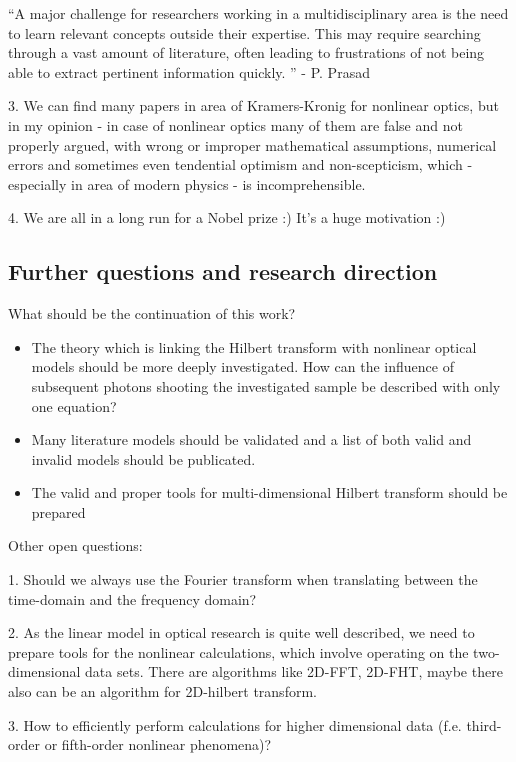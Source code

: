 \documentclass[12pt,twoside,a4paper]{article}
\numberwithin{equation}{subsection}
\numberwithin{figure}{subsection}
\begin{document}
``A major challenge for researchers working in a multidisciplinary area is the need to learn relevant concepts outside their expertise. This may require searching through a vast amount of literature, often leading to frustrations of not being able to extract pertinent information quickly. '' - P. Prasad \cite{prasad_nanophotonics}

3. We can find many papers in area of Kramers-Kronig for nonlinear optics, but in my opinion - in case of nonlinear optics many of them are false and not properly argued, with wrong or improper mathematical assumptions, numerical errors and sometimes even tendential optimism and non-scepticism, which - especially in area of modern physics - is incomprehensible.

4. We are all in a long run for a Nobel prize :) It's a huge motivation :)

\subsection{Further questions and research direction} \label{chap:conclusion_further}

What should be the continuation of this work?

\begin{itemize} 
	\item The theory which is linking the Hilbert transform with nonlinear optical models should be more deeply investigated. How can the influence of subsequent photons shooting the investigated sample be described with only one equation?
	\item Many literature models should be validated and a list of both valid and invalid models should be publicated.
	\item The valid and proper tools for multi-dimensional Hilbert transform should be prepared
\end{itemize}


Other open questions:

1. Should we always use the Fourier transform when translating between the time-domain and the frequency domain?

2. As the linear model in optical research is quite well described, we need to prepare tools for the nonlinear calculations, which involve operating on the two-dimensional data sets. There are algorithms like 2D-FFT, 2D-FHT, maybe there also can be an algorithm for 2D-hilbert transform.

3. How to efficiently perform calculations for higher dimensional data (f.e. third-order or fifth-order nonlinear phenomena)?
\end{document}
